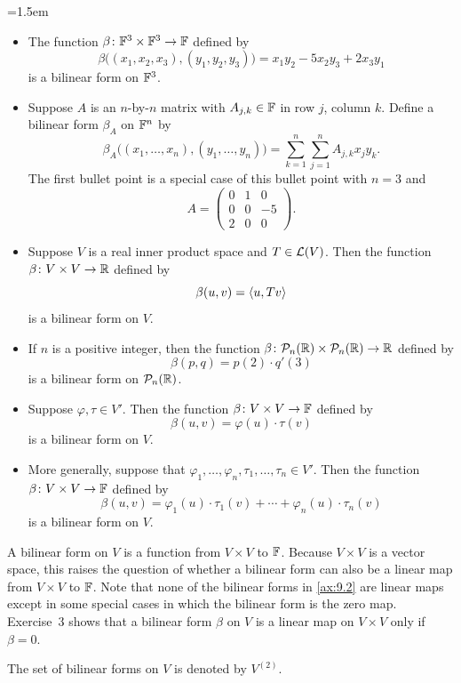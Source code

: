 \begin{example}\label{ax:9.2}\emergencystretch=1.5em\leavevmode
\begin{itemize}
\item The function $\beta\colon\mathbb{F}^3\times\mathbb{F}^3\to\mathbb{F}$ defined by
  \[ \beta\bigl((x_1,x_2,x_3),(y_1,y_2,y_3)\bigr)
     = x_1y_2-5x_2y_3+2x_3y_1 \]
  is a bilinear form on $\mathbb{F}^3$.
\item Suppose $A$ is an $n$-by-$n$ matrix with $A_{j,k}\in\mathbb{F}$ in row $j$,
  column $k$. Define a bilinear form $\beta_A$ on $\mathbb{F}^n$ by
  \[ \beta_A\bigl((x_1,\dots,x_n),(y_1,\dots,y_n)\bigr)
     = \sum_{k=1}^n\sum_{j=1}^n A_{j,k}x_jy_k. \]
  The first bullet point is a special case of this bullet point with $n=3$ and
  \[ A = \begin{pmatrix} 0&1&0\\ 0&0&-5\\ 2&0&0 \end{pmatrix}. \]
\item Suppose $V$ is a real inner product space and $T\in\mathcal{L}(V)$. Then the
  function $\beta\colon V\times V\to\mathbb{R}$ defined by
  \[ \beta(u,v) = \langle u, Tv \rangle \]
  is a bilinear form on $V$.
\item If $n$ is a positive integer, then the function
  $\beta\colon\mathcal{P}_n(\mathbb{R})\times\mathcal{P}_n(\mathbb{R})\to\mathbb{R}$ defined by
  \[ \beta(p,q) = p(2)\cdot q'(3) \]
  is a bilinear form on $\mathcal{P}_n(\mathbb{R})$.
\item Suppose $\varphi,\tau\in V'$. Then the function
  $\beta\colon V\times V\to\mathbb{F}$ defined by
  \[ \beta(u,v) = \varphi(u)\cdot\tau(v) \]
  is a bilinear form on $V$.
\item More generally, suppose that
  $\varphi_1,\dots,\varphi_n,\tau_1,\dots,\tau_n\in V'$. Then the function
  $\beta\colon V\times V\to\mathbb{F}$ defined by
  \[ \beta(u,v) = \varphi_1(u)\cdot\tau_1(v)+\cdots+\varphi_n(u)\cdot\tau_n(v) \]
  is a bilinear form on $V$.
\end{itemize}
\end{example}

A bilinear form on $V$ is a function from $V\times V$ to $\mathbb{F}$. Because
$V\times V$ is a vector space, this raises the question of whether a bilinear
form can also be a linear map from $V\times V$ to $\mathbb{F}$. Note that none of the
bilinear forms in \ref{ax:9.2} are linear maps except in some special cases in
which the bilinear form is the zero map. Exercise~3 shows that a bilinear form
$\beta$ on $V$ is a linear map on $V\times V$ only if $\beta=0$.

\begin{definition}[$V^{(2)}$]\label{ax:9.3}
The set of bilinear forms on $V$ is denoted by $V^{(2)}$.
\end{definition}

